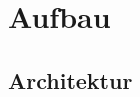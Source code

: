 \chapter{Aufbau}

\newcommand{\class}[1]{\textcolor{BlueViolet}{\sloppy{#1}}}
\newcommand{\interface}[1]{\textcolor{OliveGreen}{\mbox{\sloppy{#1}}}}
\newcommand{\xna}[1]{\textcolor{Gray}{\sloppy{#1}}}



\section{Architektur}



